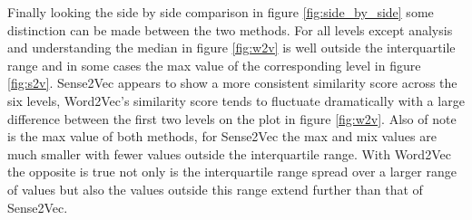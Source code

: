 \noindent
Finally looking the side by side comparison in figure \ref{fig:side_by_side} some distinction can be made between the two methods. For all levels except analysis and understanding the median in figure \ref{fig:w2v} is well outside the interquartile range and in some cases the max value of the corresponding level in figure \ref{fig:s2v}. Sense2Vec appears to show a more consistent similarity score across the six levels, Word2Vec's similarity score tends to fluctuate dramatically with a large difference between the first two levels on the plot in figure \ref{fig:w2v}. Also of note is the max value of both methods, for Sense2Vec the max and mix values are much smaller with fewer values outside the interquartile range. With Word2Vec the opposite is true not only is the interquartile range spread over a larger range of values but also the values outside this range extend further than that of Sense2Vec.